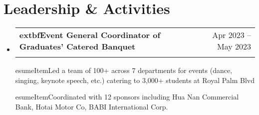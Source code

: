 \documentclass[letterpaper,11pt]{article}
\makeatletter
\newcommand{\resumeSubheading}[4]{
  \vspace{-2pt}\item
    \begin{tabular*}{0.97\textwidth}[t]{l@{\extracolsep{\fill}}r}
      \textbf{#1} & #2 \\
      \textit{\small#3} & \textit{\small #4} \\
    \end{tabular*}\vspace{-7pt}
}
\newcommand{\resumeSubHeadingListStart}{\begin{itemize}[leftmargin=0.15in, label={}]}
\newcommand{\resumeSubHeadingListEnd}{\end{itemize}}
\newcommand{\resumeItemListStart}{\begin{itemize}}
\newcommand{\resumeItemListEnd}{\end{itemize}\vspace{-5pt}}
\makeatother
\begin{document}
\section{Leadership \& Activities}
  \resumeSubHeadingListStart
    \resumeSubheading
      {	extbf{Event General Coordinator of Graduates' Catered Banquet}}{Apr 2023 -- May 2023}
      {}{}
      \resumeItemListStart
        
esumeItem{Led a team of 100+ across 7 departments for events (dance, singing, keynote speech, etc.) catering to 3,000+ students at Royal Palm Blvd}
        
esumeItem{Coordinated with 12 sponsors including Hua Nan Commercial Bank, Hotai Motor Co, BABI International Corp.}
      \resumeItemListEnd
  \resumeSubHeadingListEnd
\end{document}
